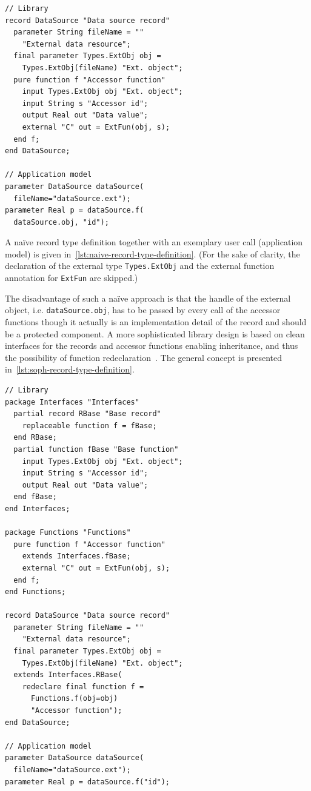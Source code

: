 \documentclass{modelica}
\newcommand{\modelica}[1]{\lstinline[language=modelica]|#1|}
\begin{document}
\begin{lstlisting}[caption=Na\"ive record type definition, label=lst:naive-record-type-definition, language=modelica]
// Library
record DataSource "Data source record"
  parameter String fileName = ""
    "External data resource";
  final parameter Types.ExtObj obj =
    Types.ExtObj(fileName) "Ext. object";
  pure function f "Accessor function"
    input Types.ExtObj obj "Ext. object";
    input String s "Accessor id";
    output Real out "Data value";
    external "C" out = ExtFun(obj, s);
  end f;
end DataSource;

// Application model
parameter DataSource dataSource(
  fileName="dataSource.ext");
parameter Real p = dataSource.f(
  dataSource.obj, "id");
\end{lstlisting}

A na\"ive record type definition together with an exemplary user call (application model) is given in~\autoref{lst:naive-record-type-definition}.
(For the sake of clarity, the declaration of the external type \modelica{Types.ExtObj} and the external function annotation for \modelica{ExtFun} are skipped.)

The disadvantage of such a na\"ive approach is that the handle of the external object, i.e. \modelica{dataSource.obj}, has to be passed by every call of the accessor functions though it actually is an implementation detail of the record and should be a protected component.
A more sophisticated library design is based on clean interfaces for the records and accessor functions enabling inheritance, and thus the possibility of function redeclaration~\cite{modelisax2018hints}.
The general concept is presented in~\autoref{lst:soph-record-type-definition}.

\begin{lstlisting}[caption=Sophisticated record type definition, label=lst:soph-record-type-definition, language=modelica]
// Library
package Interfaces "Interfaces"
  partial record RBase "Base record"
    replaceable function f = fBase;
  end RBase;
  partial function fBase "Base function"
    input Types.ExtObj obj "Ext. object";
    input String s "Accessor id";
    output Real out "Data value";
  end fBase;
end Interfaces;

package Functions "Functions"
  pure function f "Accessor function"
    extends Interfaces.fBase;
    external "C" out = ExtFun(obj, s);
  end f;
end Functions;

record DataSource "Data source record"
  parameter String fileName = ""
    "External data resource";
  final parameter Types.ExtObj obj =
    Types.ExtObj(fileName) "Ext. object";
  extends Interfaces.RBase(
    redeclare final function f =
      Functions.f(obj=obj)
      "Accessor function");
end DataSource;

// Application model
parameter DataSource dataSource(
  fileName="dataSource.ext");
parameter Real p = dataSource.f("id");
\end{lstlisting}
\end{document}
